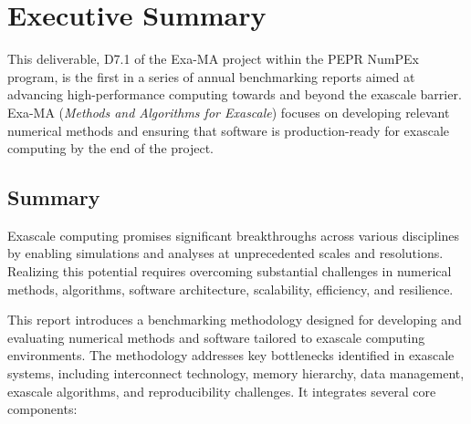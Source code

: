 \clearpage
\section*{Executive Summary}
\label{sec:summary}

This deliverable, D7.1 of the Exa-MA project within the PEPR NumPEx program, is the first in a series of annual benchmarking reports aimed at advancing high-performance computing towards and beyond the exascale barrier. Exa-MA (\emph{Methods and Algorithms for Exascale}) focuses on developing relevant numerical methods and ensuring that software is production-ready for exascale computing by the end of the project.

\subsection*{Summary}

Exascale computing promises significant breakthroughs across various disciplines by enabling simulations and analyses at unprecedented scales and resolutions. Realizing this potential requires overcoming substantial challenges in numerical methods, algorithms, software architecture, scalability, efficiency, and resilience.

This report introduces a  benchmarking methodology designed for developing and evaluating numerical methods and software tailored to exascale computing environments. The methodology addresses key bottlenecks identified in exascale systems, including interconnect technology, memory hierarchy, data management, exascale algorithms, and reproducibility challenges. 
It integrates several core components:

